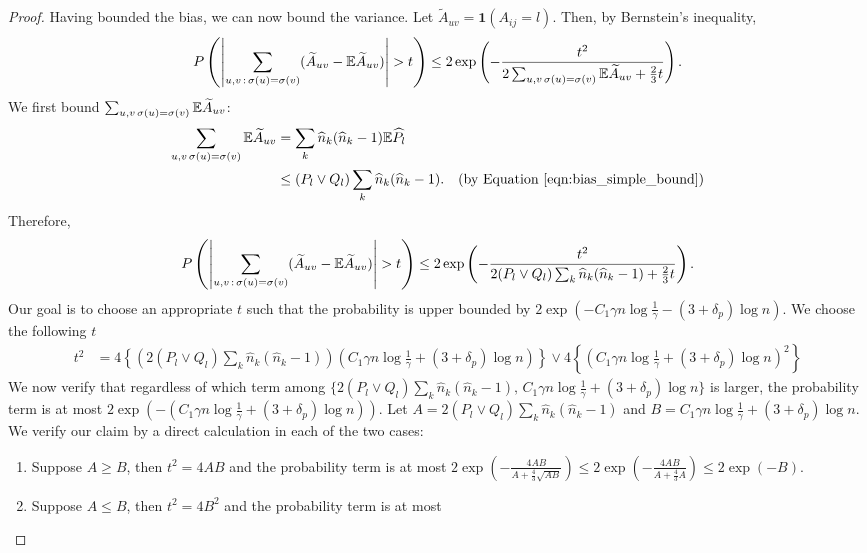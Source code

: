 \documentclass{article}
\begin{document}
\begin{proof}
Having bounded the bias, we can now bound the variance. Let $ \tilde{A}_{uv} = \mathbf{1}(A_{ij} = l)$. Then, by Bernstein's inequality,
\[
P\left( \left| \sum_{u,v\,:\, \sigma(u) = \sigma(v)} (\widetilde{A}_{uv} - {\mathbb E} \widetilde{A}_{uv} ) \right|  > t 
 \right) \leq 2 \exp\left( 
    - \frac{t^2}{ 2 \sum_{u,v \, \sigma(u) = \sigma(v)} {\mathbb E} \widetilde{A}_{uv}  + \frac{2}{3}t }
\right).
\]
We first bound $\sum_{u,v \, \sigma(u) = \sigma(v)} {\mathbb E} \widetilde{A}_{uv}$:
\begin{align*}
\sum_{u,v \, \sigma(u) = \sigma(v)} {\mathbb E} \widetilde{A}_{uv} &=
  \sum_k \widehat{n}_k (\widehat{n}_k - 1) {\mathbb E} \widehat{P}_l \\
 &\leq (P_l \vee Q_l) \sum_k \widehat{n}_k (\widehat{n}_k - 1). \quad 
  \textrm{(by Equation~\ref{eqn:bias_simple_bound})}
\end{align*}
Therefore,
\[
P\left( \left| \sum_{u,v\,:\, \sigma(u) = \sigma(v)} (\widetilde{A}_{uv} - {\mathbb E} \widetilde{A}_{uv} ) \right|  > t 
 \right) \leq 2 \exp\left( 
    - \frac{t^2}{ 2 (P_l \vee Q_l) \sum_k \widehat{n}_k (\widehat{n}_k - 1)  + \frac{2}{3}t } 
\right).
\]
Our goal is to choose an appropriate $t$ such that the probability is upper bounded by $2\exp( - C_1 \gamma n \log \frac{1}{\gamma} - (3+\delta_p) \log n )$. We choose the following $t$
\begin{align*}
t^2 &= 4 \left\{  \left( 2 (P_l \vee Q_l) \sum_k \hat{n}_k (\hat{n}_k - 1) \right) 
      \left( 
     C_1\gamma n \log \frac{1}{\gamma} + (3+\delta_p) \log n \right) \right\} 
      \vee 
   4  \left\{
   \left(  C_1\gamma n \log \frac{1}{\gamma} + (3 + \delta_p) \log n \right)^2 \right\} 
\end{align*}
We now verify that regardless of which term among $\{ 2 (P_l \vee Q_l) \sum_k \hat{n}_k (\hat{n}_k - 1) ,\,   C_1\gamma n \log \frac{1}{\gamma} + (3+\delta_p) \log n\}$ is larger, the probability term is at most $2 \exp\left( -  \left(  C_1\gamma n \log \frac{1}{\gamma} + (3+\delta_p) \log n \right) \right)$. Let $A = 2(P_l \vee Q_l)\sum_k \hat{n}_k (\hat{n}_k - 1)$ and
 $B =   C_1\gamma n \log \frac{1}{\gamma} + (3+\delta_p) \log n$. We verify our claim by a direct calculation in each of the two cases:
\begin{enumerate}
\item Suppose $A \geq B$, then $t^2 = 4AB$ and the probability term is at most
    $2 \exp \left( - \frac{4 AB}{A + \frac{4}{3} \sqrt{AB}} \right)  \leq 2 \exp \left( - \frac{4 AB}{A + \frac{4}{3} A} \right) \leq  2 \exp( - B )$. 
\item Suppose $A \leq B$, then $t^2 = 4B^2$ and the probability term is at most

\end{enumerate}
\end{proof}
\end{document}
